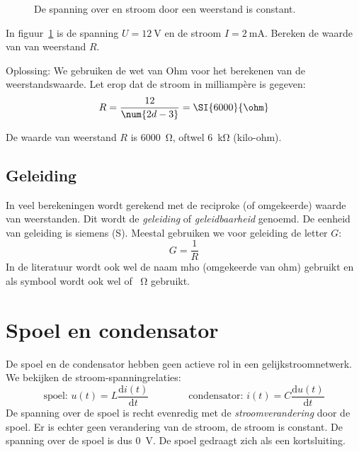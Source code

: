 \begin{figure}[!ht]
\centering
{}
\caption{De spanning over en stroom door een weerstand is constant.}
\label{fig:geldewetvanohm}
\end{figure}

\begin{example}
In figuur~\ref{fig:geldewetvanohm} is de spanning $U=\SI{12}{\volt}$ en de stroom $I=\SI{2}{\milli\ampere}$.
Bereken de waarde van van weerstand $R$.

Oplossing: We gebruiken de wet van Ohm voor het berekenen van de weerstandswaarde. Let erop dat de stroom in milliampère is gegeven:
\begin{equation}
R = \dfrac{12}{\num{2d-3}} = \SI{6000}{\ohm} 
\end{equation}

De waarde van weerstand $R$ is \SI{6000}{\ohm}, oftwel \SI{6}{\kilo\ohm} (kilo-ohm).
\end{example}

\subsection{Geleiding}
\label{sec:gelgeleiding}
In veel berekeningen wordt gerekend met de reciproke (of omgekeerde) waarde van weerstanden. Dit wordt
de \textsl{geleiding} of \textsl{geleidbaarheid} genoemd. De eenheid van geleiding is siemens (\si{\siemens}).
Meestal gebruiken we voor geleiding de letter $G$:
\begin{equation}
\label{equ:geleiding}
G = \dfrac{1}{R}
\end{equation}
In de literatuur wordt ook wel de naam mho (omgekeerde van ohm) gebruikt en als symbool wordt ook wel \si{\mho} of \si{\per\ohm} gebruikt.


\section{Spoel en condensator}
De spoel en de condensator hebben geen actieve rol in een gelijkstroomnetwerk. We bekijken de stroom-spanningrelaties:
%
\begin{equation}
\text{spoel: } u(t) = L\dfrac{\mathrm{d}i(t)}{\mathrm{d}t} \qquad\qquad \text{condensator: } i(t) = C\dfrac{\mathrm{d}u(t)}{\mathrm{d}t}
\end{equation}
%
De spanning over de spoel is recht evenredig met de \textsl{stroomverandering} door de spoel. Er is echter geen verandering van de stroom, de stroom is constant. De spanning over de spoel is dus \SI{0}{\volt}. De spoel gedraagt zich als een kortsluiting.

